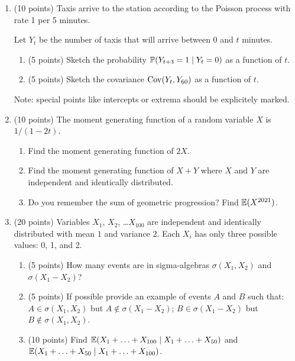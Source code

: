 \begin{enumerate}
\item %
(10 points) Taxis arrive to the station according to the Poisson process with rate 1 per 5 minutes. 

Let $Y_t$ be the number of taxis that will arrive between 0 and $t$ minutes.

\begin{enumerate}
  \item (5 points) Sketch the probability $\P(Y_{t+3} = 1 \mid Y_t = 0)$ as a function of $t$.
  \item (5 points) Sketch the covariance $\Cov(Y_t, Y_{60})$ as a function of $t$.
\end{enumerate}

Note: special points like intercepts or extrema should be explicitely marked.

\item (10 points) The moment generating function of a random variable $X$ is $1/(1-2t)$.
\begin{enumerate}
    \item Find the moment generating function of $2X$.
    \item Find the moment generating function of $X + Y$ where $X$ and $Y$ are independent and identically distributed.
    \item Do you remember the sum of geometric progression? Find $\E(X^{2021})$.
\end{enumerate}

\item (20 points) Variables $X_1$, $X_2$, \ldots $X_{100}$ are independent and identically distributed
with mean $1$ and variance $2$. Each $X_i$ has only three possible values: 0, 1, and 2. 

\begin{enumerate}
  \item (5 points) How many events are in sigma-algebras $\sigma(X_1, X_2)$ and $\sigma(X_1 - X_2)$?
  \item (5 points) If possible provide an example of events $A$ and $B$ such that: $A\in \sigma(X_1, X_2)$ but $A\not\in\sigma(X_1 - X_2)$; $B\in \sigma(X_1 - X_2)$ but $B\not\in\sigma(X_1, X_2)$.
  \item (10 points) Find $\E(X_1 + \ldots + X_{100} \mid X_1 + \ldots + X_{50})$ and $\E(X_1 + \ldots + X_{50} \mid X_1 + \ldots + X_{100})$.
\end{enumerate}






\end{enumerate}






